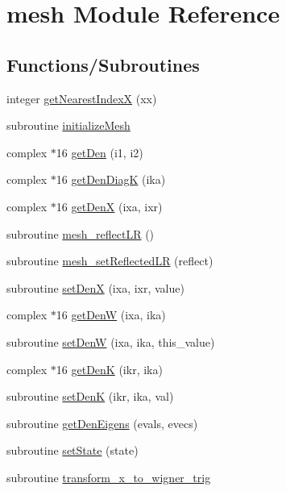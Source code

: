\hypertarget{namespacemesh}{
\section{mesh Module Reference}
\label{namespacemesh}
}
\subsection*{Functions/Subroutines}
\begin{DoxyCompactItemize}
\item 
integer \hyperlink{namespacemesh_ad1beeceb5580c23eb4fd6530573c395c}{getNearestIndexX} (xx)
\item 
subroutine \hyperlink{namespacemesh_a742012f09e48891eb9dd2a85601674a8}{initializeMesh}
\item 
complex $\ast$16 \hyperlink{namespacemesh_a30c07812e0215d470457c9be91bb6b65}{getDen} (i1, i2)
\item 
complex $\ast$16 \hyperlink{namespacemesh_af6c300cbff24f4eb25b428d822208430}{getDenDiagK} (ika)
\item 
complex $\ast$16 \hyperlink{namespacemesh_a87ae177a6a4383943393f8efa7da0018}{getDenX} (ixa, ixr)
\item 
subroutine \hyperlink{namespacemesh_abf02ca88d15c266099562e937ee507e4}{mesh\_\-reflectLR} ()
\item 
subroutine \hyperlink{namespacemesh_ac5a0f33502939ba9fae215e203d895f0}{mesh\_\-setReflectedLR} (reflect)
\item 
subroutine \hyperlink{namespacemesh_a7f55b8b4c3e045f04553b292c323b43a}{setDenX} (ixa, ixr, value)
\item 
complex $\ast$16 \hyperlink{namespacemesh_a54f9135de9933edd2a34168c4e5ebfca}{getDenW} (ixa, ika)
\item 
subroutine \hyperlink{namespacemesh_a7e79531a47425f91c6ac0921fc2203ed}{setDenW} (ixa, ika, this\_\-value)
\item 
complex $\ast$16 \hyperlink{namespacemesh_ab4cd19eafd4df4568c11c147b12f952d}{getDenK} (ikr, ika)
\item 
subroutine \hyperlink{namespacemesh_a16330a30f3f56c2944ef63240c049ee7}{setDenK} (ikr, ika, val)
\item 
subroutine \hyperlink{namespacemesh_ab3a026a1c77fc428f9a77f0ee37b0616}{getDenEigens} (evals, evecs)
\item 
subroutine \hyperlink{namespacemesh_aef51df23ee69f610420b25672a2da3ef}{setState} (state)
\item 
subroutine \hyperlink{namespacemesh_a0469cb1ff672271ea58fa1cca5daec7a}{transform\_\-x\_\-to\_\-wigner\_\-trig}

\end{DoxyCompactItemize}
